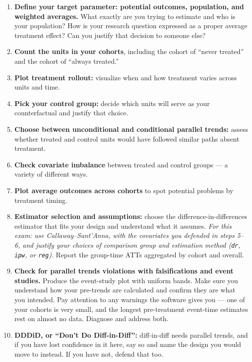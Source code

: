\documentclass[11pt,a4paper]{article}
\newcommand{\code}[1]{\texttt{\color{ChiantiRed}#1}}
\begin{document}
\begin{checkbox}
\begin{enumerate}[itemsep=3pt, leftmargin=1.6em]
  \item \textbf{Define your target parameter: potential outcomes, population, and weighted averages.} What exactly are you trying to estimate and who is your population? How is your research question expressed as a proper average treatment effect? Can you justify that decision to someone else?
  \item \textbf{Count the units in your cohorts}, including the cohort of ``never treated'' and the cohort of ``always treated.''
  \item \textbf{Plot treatment rollout:} visualize when and how treatment varies across units and time.
  \item \textbf{Pick your control group:} decide which units will serve as your counterfactual and justify that choice.
  \item \textbf{Choose between unconditional and conditional parallel trends:} assess whether treated and control units would have followed similar paths absent treatment.
  \item \textbf{Check covariate imbalance} between treated and control groups --- a variety of different ways.
  \item \textbf{Plot average outcomes across cohorts} to spot potential problems by treatment timing.
  \item \textbf{Estimator selection and assumptions:} choose the difference-in-differences estimator that fits your design and understand what it assumes. \emph{For this exam: use Callaway--Sant'Anna, with the covariates you defended in steps 5--6, and justify your choices of comparison group and estimation method (\code{dr}, \code{ipw}, or \code{reg}).} Report the group-time ATTs aggregated by cohort and overall.
  \item \textbf{Check for parallel trends violations with falsifications and event studies.} Produce the event-study plot with uniform bands. Make sure you understand how your pre-trends are calculated and confirm they are what you intended. Pay attention to any warnings the software gives you --- one of your cohorts is very small, and the longest pre-treatment event-time estimates rest on almost no data. Diagnose and address both.
  \item \textbf{DDDiD, or ``Don't Do Diff-in-Diff'':} diff-in-diff needs parallel trends, and if you have lost confidence in it here, say so and name the design you would move to instead. If you have not, defend that too.
\end{enumerate}
\end{checkbox}
\end{document}
